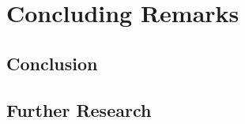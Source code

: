 \chapter{Concluding Remarks} \label{chap:concluding-remarks}

\section{Conclusion}

\section{Further Research}